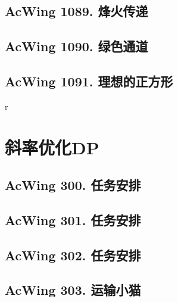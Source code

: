 \subsection{AcWing 1089. 烽火传递}

\subsection{AcWing 1090. 绿色通道}

\subsection{AcWing 1091. 理想的正方形}
r


\section{斜率优化DP}

\subsection{AcWing 300. 任务安排}

\subsection{AcWing 301. 任务安排}

\subsection{AcWing 302. 任务安排}

\subsection{AcWing 303. 运输小猫}